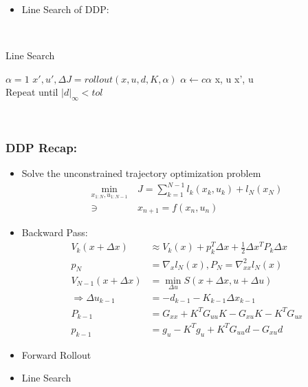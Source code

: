\begin{itemize}
    \item Line Search of DDP:
\end{itemize}
\\
\noindent
\begin{algorithm}
	\caption{Line Search}
	\label{alg:linesearch}
	\begin{algorithmic}[1]	
        \State $\alpha = 1$
	     
            \State $x', u', \Delta J = rollout(x, u, d, K, \alpha)$ 
            \State $\alpha \gets c \alpha$ 
            \State x, u \gets x', u \\
            \State Repeat until $|d|_\infty < tol$
        \Endwhile
	\end{algorithmic}
\end{algorithm}
\\

\subsubsection{DDP Recap:}
\begin{itemize}
    \item Solve the unconstrained trajectory optimization problem
    \begin{align}
        \min_{x_{1:N}, u_{1:N-1}} \ & J = \sum_{k=1}^{N-1} l_k(x_k, u_k) + l_N(x_N) \\
        \ni \ & x_{n+1} = f(x_n,u_n)
    \end{align}
    \item Backward Pass:
    \begin{align}
        V_k(x + \Delta x) & \approx V_k(x) + p_k^T \Delta x + \frac{1}{2}\Delta x^T P_k \Delta x \\
        p_N & = \nabla_x l_N(x), P_N = \nabla_{xx}^2 l_N(x) \\
        V_{N-1}(x + \Delta x) & = \min_{\Delta u} S(x + \Delta x, u + \Delta u) \\
        \Rightarrow \Delta u_{k-1} & = -d_{k-1} - K_{k-1} \Delta x_{k-1} \\
        P_{k-1} & = G_{xx} + K^T G_{uu} K - G_{xu} K - K^T G_{ux} \\
        p_{k-1} & = g_u - K^T g_u + K^T G_{uu} d - G_{xu}d
    \end{align}
    \item Forward Rollout
    \item Line Search
\end{itemize}


